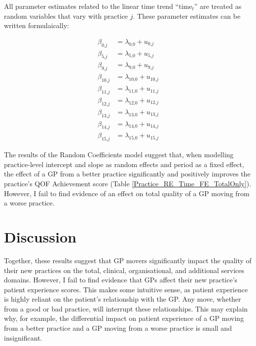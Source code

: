\documentclass[11pt]{article}
\newcommand{\mc}{\textrm{,}}
\begin{document}
All parameter estimates related to the linear time trend ``$\textrm{time}_t$'' are treated as random variables that vary with practice $j$. These parameter estimates can be written formulaically:

\begin{equation} \label{RandomCoefficientsITSABeta}
\begin{split}
  \beta_{0  \mc j}  & = \lambda_{0  \mc 0} + u_{0  \mc j}  \\
  \beta_{5  \mc j}  & = \lambda_{5  \mc 0} + u_{5  \mc j}  \\
  \beta_{9  \mc j}  & = \lambda_{9  \mc 0} + u_{9  \mc j}  \\
  \beta_{10 \mc j}  & = \lambda_{10 \mc 0} + u_{10 \mc j}  \\
  \beta_{11 \mc j}  & = \lambda_{11 \mc 0} + u_{11 \mc j}  \\
  \beta_{12 \mc j}  & = \lambda_{12 \mc 0} + u_{12 \mc j}  \\
  \beta_{13 \mc j}  & = \lambda_{13 \mc 0} + u_{13 \mc j}  \\
  \beta_{14 \mc j}  & = \lambda_{14 \mc 0} + u_{14 \mc j}  \\
  \beta_{15 \mc j}  & = \lambda_{15 \mc 0} + u_{15 \mc j}
\end{split}
\end{equation}





The results of the Random Coefficients model suggest that, when modelling practice-level intercept and slope as random effects and period as a fixed effect, the effect of a GP from a better practice significantly and positively improves the practice's QOF Achievement score (Table \ref{Practice_RE_Time_FE_TotalOnly}). However, I fail to find evidence of an effect on total quality of a GP moving from a worse practice.



\section{Discussion}

Together, these results suggest that GP movers significantly impact the quality of their new practices on the total, clinical, organisational, and additional services domains. However, I fail to find evidence that GPs affect their new practice's patient experience scores. This makes some intuitive sense, as patient experience is highly reliant on the patient's relationship with the GP. Any move, whether from a good or bad practice, will interrupt these relationships. This may explain why, for example, the differential impact on patient experience of a GP moving from a better practice and a GP moving from a worse practice is small and insignificant.
\end{document}

